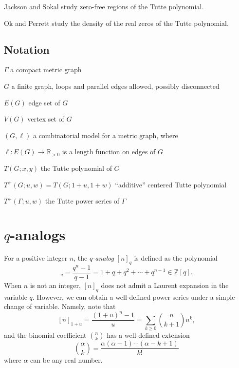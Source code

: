 \documentclass{amsart}
\theoremstyle{definition}
\newcommand{\RR}{\mathbb{R}}
\newcommand{\ZZ}{\mathbb{Z}}
\newcommand{\RRpos}{\RR_{>0}}
\newcommand{\en}{n}
\begin{document}
Jackson and Sokal \cite{JS} study zero-free regions of the Tutte polynomial.

Ok and Perrett \cite{OP} study the density of the real zeros of the Tutte polynomial.


\subsection{Notation}

$\Gamma$ a compact metric graph

$G$ a finite graph, 
loops and parallel edges allowed,
possibly disconnected

$E(G)$ edge set of $G$

$V(G)$ vertex set of $G$

$(G,\ell)$ a combinatorial model for a metric graph,
where 

$\ell : E(G) \to \RRpos$
is a length function on edges of $G$

$T(G; x,y)$ the Tutte polynomial of $G$

$T^+(G; u,w) = T(G; 1+u,1+w)$ ``additive'' centered Tutte polynomial

$T^+(\Gamma; u,w)$ the Tutte power series of $\Gamma$





\section{\texorpdfstring{$q$}{q}-analogs}

For a positive integer $\en$, the {\em $q$-analog} $[\en]_q$ is defined as
the polynomial
\begin{equation*}
	[\en]_q = \frac{q^\en - 1}{q - 1}
	= 1 + q + q^2 + \cdots + q^{\en -1} 
	\in \ZZ[q].
\end{equation*}
When $\en$ is not an integer, 
$[\en]_q$ does not admit a Laurent expansion in the variable $q$.
However, we can obtain a well-defined power series under a simple change of variable.
Namely, note that
\[ 
	[\en]_{1+u} = \frac{(1+u)^\en - 1}{u}
= \sum_{k \geq 0} \binom{\en}{k+1}u^{k},
\]
and the binomial coefficient $\binom{n}{k}$ has a well-defined extension
\begin{equation}
\binom{\alpha}{k} = \frac{\alpha (\alpha-1) \cdots (\alpha-k+1)}{k!} 
\end{equation}
where $\alpha$ can be any real number.
\end{document}
